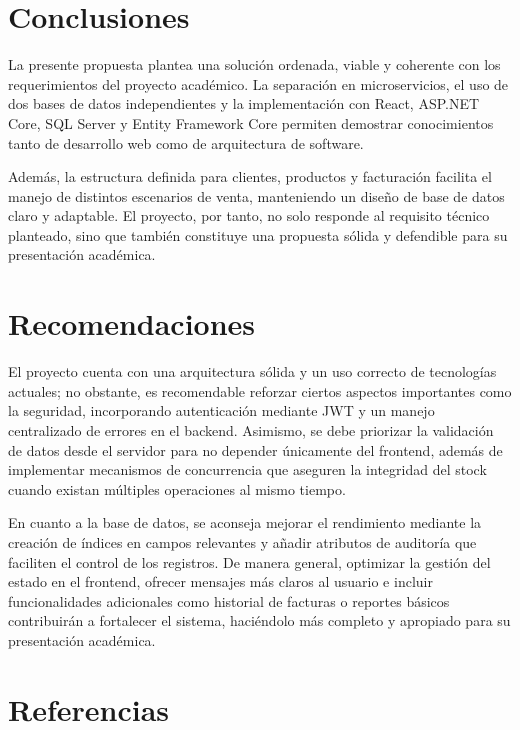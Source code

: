 \documentclass[12pt]{article}
\begin{document}
\section{Conclusiones}

La presente propuesta plantea una solución ordenada, viable y coherente con los requerimientos del proyecto académico. La separación en microservicios, el uso de dos bases de datos independientes y la implementación con React, ASP.NET Core, SQL Server y Entity Framework Core permiten demostrar conocimientos tanto de desarrollo web como de arquitectura de software.

Además, la estructura definida para clientes, productos y facturación facilita el manejo de distintos escenarios de venta, manteniendo un diseño de base de datos claro y adaptable. El proyecto, por tanto, no solo responde al requisito técnico planteado, sino que también constituye una propuesta sólida y defendible para su presentación académica.

\section{Recomendaciones}

El proyecto cuenta con una arquitectura sólida y un uso correcto de tecnologías actuales; no obstante, es recomendable reforzar ciertos aspectos importantes como la seguridad, incorporando autenticación mediante JWT y un manejo centralizado de errores en el backend. Asimismo, se debe priorizar la validación de datos desde el servidor para no depender únicamente del frontend, además de implementar mecanismos de concurrencia que aseguren la integridad del stock cuando existan múltiples operaciones al mismo tiempo.

En cuanto a la base de datos, se aconseja mejorar el rendimiento mediante la creación de índices en campos relevantes y añadir atributos de auditoría que faciliten el control de los registros. De manera general, optimizar la gestión del estado en el frontend, ofrecer mensajes más claros al usuario e incluir funcionalidades adicionales como historial de facturas o reportes básicos contribuirán a fortalecer el sistema, haciéndolo más completo y apropiado para su presentación académica.

\section{Referencias}
\end{document}
